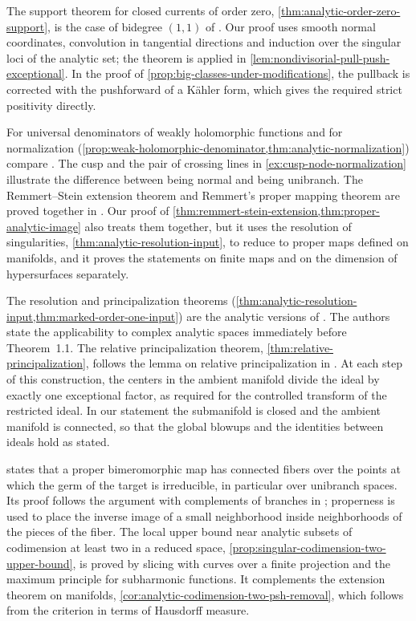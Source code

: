 The support theorem for closed currents of order zero, \cref{thm:analytic-order-zero-support}, is the case of bidegree $(1,1)$ of \cite[Chapter III, (2.10)--(2.14)]{DemBook}. Our proof uses smooth normal coordinates, convolution in tangential directions and induction over the singular loci of the analytic set; the theorem is applied in \cref{lem:nondivisorial-pull-push-exceptional}. In the proof of \cref{prop:big-classes-under-modifications}, the pullback is corrected with the pushforward of a K\"ahler form, which gives the required strict positivity directly.

For universal denominators of weakly holomorphic functions and for normalization (\cref{prop:weak-holomorphic-denominator,thm:analytic-normalization}) compare \cite[Chapter II, (7.1)--(7.15)]{DemBook}. The cusp and the pair of crossing lines in \cref{ex:cusp-node-normalization} illustrate the difference between being normal and being unibranch. The Remmert--Stein extension theorem and Remmert's proper mapping theorem are proved together in \cite[Chapter II, (8.7)--(8.8)]{DemBook}. Our proof of \cref{thm:remmert-stein-extension,thm:proper-analytic-image} also treats them together, but it uses the resolution of singularities, \cref{thm:analytic-resolution-input}, to reduce to proper maps defined on manifolds, and it proves the statements on finite maps and on the dimension of hypersurfaces separately.

The resolution and principalization theorems (\cref{thm:analytic-resolution-input,thm:marked-order-one-input}) are the analytic versions of \cite[Theorems 1.1 and 1.3; Definitions 2.1--2.2]{BM08}. The authors state the applicability to complex analytic spaces immediately before Theorem~1.1. The relative principalization theorem, \cref{thm:relative-principalization}, follows the lemma on relative principalization in \cite[Lemma \texttt{relative-principalization}]{VuXiaNakamaye}. At each step of this construction, the centers in the ambient manifold divide the ideal by exactly one exceptional factor, as required for the controlled transform of the restricted ideal. In our statement the submanifold is closed and the ambient manifold is connected, so that the global blowups and the identities between ideals hold as stated.

 states that a proper bimeromorphic map has connected fibers over the points at which the germ of the target is irreducible, in particular over unibranch spaces. Its proof follows the argument with complements of branches in \cite[Appendix on unibranch spaces]{XiaSampleBook}; properness is used to place the inverse image of a small neighborhood inside neighborhoods of the pieces of the fiber. The local upper bound near analytic subsets of codimension at least two in a reduced space, \cref{prop:singular-codimension-two-upper-bound}, is proved by slicing with curves over a finite projection and the maximum principle for subharmonic functions. It complements the extension theorem on manifolds, \cref{cor:analytic-codimension-two-psh-removal}, which follows from the criterion in terms of Hausdorff measure.

